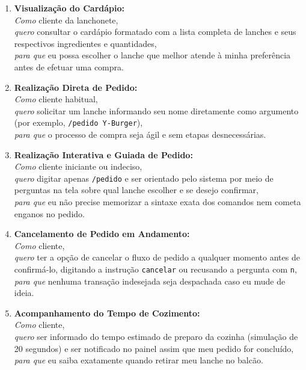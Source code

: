 \documentclass[12pt]{article}
\begin{document}
\begin{enumerate}
    \item[\textbf{US01}] \textbf{Visualização do Cardápio:} \\
    \textit{Como} cliente da lanchonete, \\
    \textit{quero} consultar o cardápio formatado com a lista completa de lanches e seus respectivos ingredientes e quantidades, \\
    \textit{para que} eu possa escolher o lanche que melhor atende à minha preferência antes de efetuar uma compra.
    
    \item[\textbf{US02}] \textbf{Realização Direta de Pedido:} \\
    \textit{Como} cliente habitual, \\
    \textit{quero} solicitar um lanche informando seu nome diretamente como argumento (por exemplo, \texttt{/pedido Y-Burger}), \\
    \textit{para que} o processo de compra seja ágil e sem etapas desnecessárias.

    \item[\textbf{US03}] \textbf{Realização Interativa e Guiada de Pedido:} \\
    \textit{Como} cliente iniciante ou indeciso, \\
    \textit{quero} digitar apenas \texttt{/pedido} e ser orientado pelo sistema por meio de perguntas na tela sobre qual lanche escolher e se desejo confirmar, \\
    \textit{para que} eu não precise memorizar a sintaxe exata dos comandos nem cometa enganos no pedido.

    \item[\textbf{US04}] \textbf{Cancelamento de Pedido em Andamento:} \\
    \textit{Como} cliente, \\
    \textit{quero} ter a opção de cancelar o fluxo de pedido a qualquer momento antes de confirmá-lo, digitando a instrução \texttt{cancelar} ou recusando a pergunta com \texttt{n}, \\
    \textit{para que} nenhuma transação indesejada seja despachada caso eu mude de ideia.

    \item[\textbf{US05}] \textbf{Acompanhamento do Tempo de Cozimento:} \\
    \textit{Como} cliente, \\
    \textit{quero} ser informado do tempo estimado de preparo da cozinha (simulação de 20 segundos) e ser notificado no painel assim que meu pedido for concluído, \\
    \textit{para que} eu saiba exatamente quando retirar meu lanche no balcão.


\end{enumerate}
\end{document}
